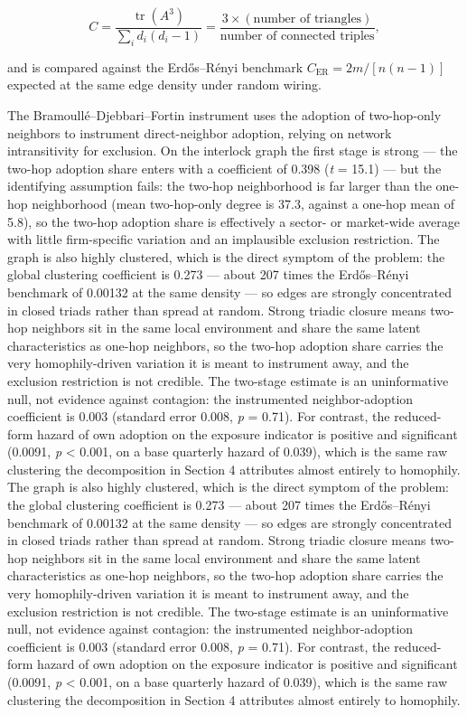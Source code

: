 \documentclass[
  a4paper,
]{article}
\begin{document}
\[ C = \frac{\operatorname{tr}(A^3)}{\sum_i d_i (d_i - 1)} = \frac{3 \times (\text{number of triangles})}{\text{number of connected triples}}, \]

and is compared against the Erdős--Rényi benchmark
\(C_{\text{ER}} = 2m / [n(n-1)]\) expected at the same edge density
under random wiring.

The Bramoullé--Djebbari--Fortin instrument uses the adoption of
two-hop-only neighbors to instrument direct-neighbor adoption, relying
on network intransitivity for exclusion. On the interlock graph the
first stage is strong --- the two-hop adoption share enters with a
coefficient of 0.398 (\emph{t} = 15.1) --- but the identifying
assumption fails: the two-hop neighborhood is far larger than the
one-hop neighborhood (mean two-hop-only degree is 37.3, against a
one-hop mean of 5.8), so the two-hop adoption share is effectively a
sector- or market-wide average with little firm-specific variation and
an implausible exclusion restriction. The graph is also highly
clustered, which is the direct symptom of the problem: the global
clustering coefficient is 0.273 --- about 207 times the Erdős--Rényi
benchmark of 0.00132 at the same density --- so edges are strongly
concentrated in closed triads rather than spread at random. Strong
triadic closure means two-hop neighbors sit in the same local
environment and share the same latent characteristics as one-hop
neighbors, so the two-hop adoption share carries the very
homophily-driven variation it is meant to instrument away, and the
exclusion restriction is not credible. The two-stage estimate is an
uninformative null, not evidence against contagion: the instrumented
neighbor-adoption coefficient is 0.003 (standard error 0.008, \emph{p} =
0.71). For contrast, the reduced-form hazard of own adoption on the
exposure indicator is positive and significant (0.0091, \emph{p}
\textless{} 0.001, on a base quarterly hazard of 0.039), which is the
same raw clustering the decomposition in Section 4 attributes almost
entirely to homophily. The graph is also highly clustered, which is the
direct symptom of the problem: the global clustering coefficient is
0.273 --- about 207 times the Erdős--Rényi benchmark of 0.00132 at the
same density --- so edges are strongly concentrated in closed triads
rather than spread at random. Strong triadic closure means two-hop
neighbors sit in the same local environment and share the same latent
characteristics as one-hop neighbors, so the two-hop adoption share
carries the very homophily-driven variation it is meant to instrument
away, and the exclusion restriction is not credible. The two-stage
estimate is an uninformative null, not evidence against contagion: the
instrumented neighbor-adoption coefficient is 0.003 (standard error
0.008, \emph{p} = 0.71). For contrast, the reduced-form hazard of own
adoption on the exposure indicator is positive and significant (0.0091,
\emph{p} \textless{} 0.001, on a base quarterly hazard of 0.039), which
is the same raw clustering the decomposition in Section 4 attributes
almost entirely to homophily.
\end{document}
